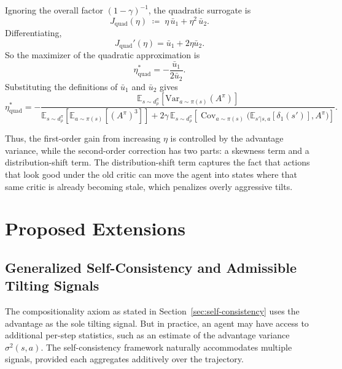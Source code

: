 \documentclass[11pt]{article}
\theoremstyle{definition}
\theoremstyle{remark}
\newcommand{\Var}{\mathrm{Var}}
\newcommand{\E}{\mathbb{E}}
\DeclareMathOperator{\Cov}{Cov}
\begin{document}
Ignoring the overall factor $(1-\gamma)^{-1}$, the quadratic surrogate is
\begin{equation}
  J_{\mathrm{quad}}(\eta)
  \;\coloneqq\;
  \eta\,\bar u_1 + \eta^2\,\bar u_2.
\end{equation}
Differentiating,
\[
  J_{\mathrm{quad}}'(\eta)
  =
  \bar u_1 + 2\eta\bar u_2.
\]
So the maximizer of the quadratic approximation is
\begin{equation}\label{eq:eta-star-correct}
  \boxed{
  \eta^*_{\mathrm{quad}}
  =
  -\frac{\bar u_1}{2\bar u_2}
  }.
\end{equation}
Substituting the definitions of $\bar u_1$ and $\bar u_2$ gives
\begin{equation}
  \boxed{
  \eta^*_{\mathrm{quad}}
  =
  -\frac{
    \E_{s\sim d_\rho^\pi}\!\left[\Var_{a\sim\pi(s)}(A^\pi)\right]
  }{
    \E_{s\sim d_\rho^\pi}\!\left[\E_{a\sim\pi(s)}[(A^\pi)^3]\right]
    + 2\gamma\,
    \E_{s\sim d_\rho^\pi}\!\left[
      \Cov_{a\sim\pi(s)}\!\bigl(\E_{s'|s,a}[\delta_1(s')],A^\pi\bigr)
    \right]
  }.
  }
\end{equation}

Thus, the first-order gain from increasing $\eta$ is controlled by the advantage variance, while the second-order correction has two parts: a skewness term and a distribution-shift term. The distribution-shift term captures the fact that actions that look good under the old critic can move the agent into states where that same critic is already becoming stale, which penalizes overly aggressive tilts.

\section{Proposed Extensions}
\label{sec:extensions}

\subsection{Generalized Self-Consistency and Admissible Tilting Signals}
\label{sec:generalized}

The compositionality axiom as stated in Section~\ref{sec:self-consistency} uses the advantage as the sole tilting signal. But in practice, an agent may have access to additional per-step statistics, such as an estimate of the advantage variance $\sigma^2(s,a)$. The self-consistency framework naturally accommodates multiple signals, provided each aggregates additively over the trajectory.
\end{document}
